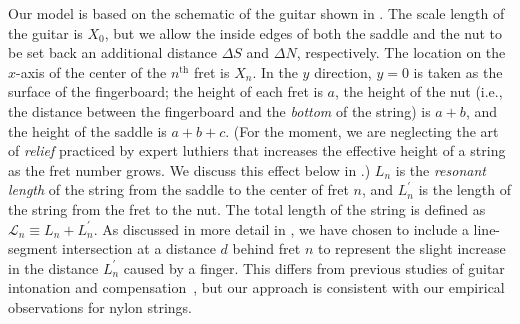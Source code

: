 Our model is based on the schematic of the guitar shown in . The scale length of the guitar is $X_0$, but we allow the inside edges of both the saddle and the nut to be set back an additional distance $\Delta S$ and $\Delta N$, respectively. The location on the $x$-axis of the center of the $n^\textrm{th}$ fret is $X_n$. In the $y$ direction, $y = 0$ is taken as the surface of the fingerboard; the height of each fret is $a$, the height of the nut (i.e., the distance between the fingerboard and the \emph{bottom} of the string) is $a + b$, and the height of the saddle is $a + b + c$. (For the moment, we are neglecting the art of \emph{relief} practiced by expert luthiers that increases the effective height of a string as the fret number grows. We discuss this effect below in .) $L_n$ is the \emph{resonant length} of the string from the saddle to the center of fret $n$, and $L^\prime_n$ is the length of the string from the fret to the nut. The total length of the string is defined as $\mathcal{L}_n \equiv L_n + L^\prime_n$. As discussed in more detail in , we have chosen to include a line-segment intersection at a distance $d$ behind fret $n$ to represent the slight increase in the distance $L_n^\prime$ caused by a finger. This differs from previous studies of guitar intonation and compensation~\cite{ref:byersgal,ref:byers1996cgi,ref:varieschi2010icf}, but our approach is consistent with our empirical observations for nylon strings.

